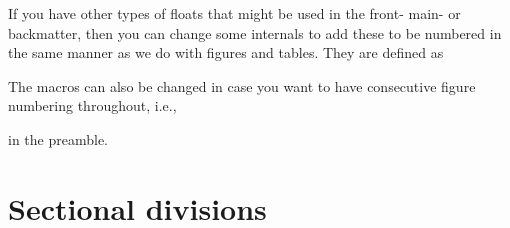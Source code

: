 If you have other types of floats that might be used in the front-
main- or backmatter, then you can change some internals to add these
to be numbered in the same manner as we do with figures and
tables. They are defined as 
\begin{lcode}
\newcommand\@memfront@floats{%
  \counterwithout{figure}{chapter}
  \counterwithout{table}{chapter}}
\newcommand\@memmain@floats{%
   \counterwithin{figure}{chapter}
   \counterwithin{table}{chapter}}
\newcommand\@memback@floats{%
    \counterwithout{figure}{chapter}
    \counterwithout{table}{chapter}
    \setcounter{figure}{0}
    \setcounter{table}{0}}
\end{lcode}
%
The macros can also be changed in case you want to have consecutive
figure numbering throughout, i.e.,
\begin{lcode}
\makeatletter
{}
\renewcommand\@memfront@floats{}
\renewcommand\@memmain@floats{}
\newcommand\@memback@floats{}
\makeatother
\end{lcode}
in the preamble.




\section{Sectional divisions}

